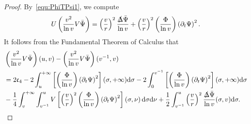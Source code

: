 \documentclass[a4paper,reqno]{amsart}
\theoremstyle{definition}
\numberwithin{equation}{section}
\def \d {{\rm{d}}}
\def \pt{\partial_{t}}
\def\Deltas{\slashed{\Delta}}
\begin{document}
\begin{proof}
By~\eqref{equ:PhiTPsi1}, we compute
\begin{equation*}
U\left(\frac{v^{2}}{\ln v}V\bar{\Psi}\right)
=\left(\frac{v}{r}\right)^{2}\frac{\Deltas \bar{\Psi}}{\ln v}
+\left(\frac{v}{r}\right)^{2}\left(\frac{\Phi}{\ln v}\right)\left(\pt \Psi\right)^{2}.
\end{equation*}
It follows from the Fundamental Theorem of Calculus that
\begin{equation*}
\begin{aligned}
&\left(\frac{v^{2}}{\ln v}V\bar{\Psi}\right)(u,v)-\left(\frac{v^{2}}{\ln v}V\bar{\Psi}\right)(v^{-1},v)\\
&=2\mathfrak{c}_{4}-2\int_{u}^{+\infty}\left[\left(\frac{\Phi}{\ln v}\right)\left(\pt \Psi\right)^{2}\right](\sigma,+\infty)\d \sigma
-
2\int_{0}^{v^{-1}}\left[\left(\frac{\Phi}{\ln v}\right)\left(\pt \Psi\right)^{2}\right](\sigma,+\infty)\d \sigma\\
&-\frac{1}{4}\int_{v}^{+\infty}\int_{v^{-1}}^{u}V\left[\left(\frac{v}{r}\right)^{2}\left(\frac{\Phi}{\ln v}\right)\left(\pt \Psi\right)^{2}\right]\left(\sigma,\nu\right)\d \sigma \d \nu
+\frac{1}{2}\int_{v^{-1}}^{u}
\left(\frac{v}{r}\right)^{2}\frac{\Deltas \bar{\Psi}}{\ln v}(\sigma,v)
\d \sigma.
\end{aligned}
\end{equation*}


\end{proof}
\end{document}
